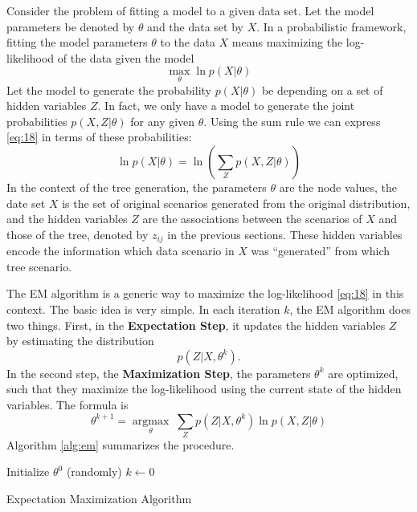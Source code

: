 Consider the problem of fitting a model to a given data set.
Let the model parameters be denoted by $\theta$ and the data set by $X$.
In a probabilistic framework, fitting the model parameters $\theta$ to the data $X$ means maximizing the log-likelihood of the data given the model
\begin{equation}
  \label{eq:18}
  \max\limits_\theta \ln p(X|\theta)
\end{equation}
Let the model to generate the probability $p(X|\theta)$ be depending on a set of hidden variables $Z$.
In fact, we only have a model to generate the joint probabilities $p(X,Z|\theta)$ for any given $\theta$.
Using the sum rule we can express \eqref{eq:18} in terms of these probabilities:
\begin{equation}
  \label{eq:19}
  \ln p(X|\theta) = \ln\left(\sum_Zp(X,Z|\theta)\right)
\end{equation}
In the context of the tree generation, the parameters $\theta$ are the node values, the date set $X$ is the set of original scenarios generated from the original distribution, and the hidden variables $Z$ are the associations between the scenarios of $X$ and those of the tree, denoted by $z_{ij}$ in the previous sections.
These hidden variables encode the information which data scenario in $X$ was ``generated'' from which tree scenario.

The EM algorithm is a generic way to maximize the log-likelihood \eqref{eq:18} in this context.
The basic idea is very simple.
In each iteration $k$, the EM algorithm does two things.
First, in the \textbf{Expectation Step}, it updates the hidden variables $Z$ by estimating the distribution
\begin{equation}
  \label{eq:20}
  p(Z|X,\theta^k).
\end{equation}
In the second step, the \textbf{Maximization Step}, the parameters $\theta^k$ are optimized, such that they maximize the log-likelihood using the current state of the hidden variables. The formula is
\begin{equation}
  \label{eq:21}
  \theta^{k+1} = \underset{\theta}{\operatorname{argmax}}\; \sum_Zp(Z|X,\theta^k)\ln p(X,Z|\theta)
\end{equation}
Algorithm \ref{alg:em} summarizes the procedure.
\begin{algorithm}
  Initialize $\theta^0$ (randomly)\;
  $k\leftarrow 0$\;
  \caption{Expectation Maximization Algorithm}
  \label{alg:em}
\end{algorithm}
%
